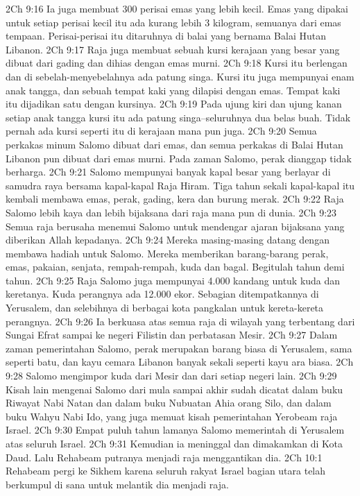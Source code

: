 2Ch 9:16  Ia juga membuat 300 perisai emas yang lebih kecil. Emas yang dipakai untuk setiap perisai kecil itu ada kurang lebih 3 kilogram, semuanya dari emas tempaan. Perisai-perisai itu ditaruhnya di balai yang bernama Balai Hutan Libanon.
2Ch 9:17  Raja juga membuat sebuah kursi kerajaan yang besar yang dibuat dari gading dan dihias dengan emas murni.
2Ch 9:18  Kursi itu berlengan dan di sebelah-menyebelahnya ada patung singa. Kursi itu juga mempunyai enam anak tangga, dan sebuah tempat kaki yang dilapisi dengan emas. Tempat kaki itu dijadikan satu dengan kursinya.
2Ch 9:19  Pada ujung kiri dan ujung kanan setiap anak tangga kursi itu ada patung singa--seluruhnya dua belas buah. Tidak pernah ada kursi seperti itu di kerajaan mana pun juga.
2Ch 9:20  Semua perkakas minum Salomo dibuat dari emas, dan semua perkakas di Balai Hutan Libanon pun dibuat dari emas murni. Pada zaman Salomo, perak dianggap tidak berharga.
2Ch 9:21  Salomo mempunyai banyak kapal besar yang berlayar di samudra raya bersama kapal-kapal Raja Hiram. Tiga tahun sekali kapal-kapal itu kembali membawa emas, perak, gading, kera dan burung merak.
2Ch 9:22  Raja Salomo lebih kaya dan lebih bijaksana dari raja mana pun di dunia.
2Ch 9:23  Semua raja berusaha menemui Salomo untuk mendengar ajaran bijaksana yang diberikan Allah kepadanya.
2Ch 9:24  Mereka masing-masing datang dengan membawa hadiah untuk Salomo. Mereka memberikan barang-barang perak, emas, pakaian, senjata, rempah-rempah, kuda dan bagal. Begitulah tahun demi tahun.
2Ch 9:25  Raja Salomo juga mempunyai 4.000 kandang untuk kuda dan keretanya. Kuda perangnya ada 12.000 ekor. Sebagian ditempatkannya di Yerusalem, dan selebihnya di berbagai kota pangkalan untuk kereta-kereta perangnya.
2Ch 9:26  Ia berkuasa atas semua raja di wilayah yang terbentang dari Sungai Efrat sampai ke negeri Filistin dan perbatasan Mesir.
2Ch 9:27  Dalam zaman pemerintahan Salomo, perak merupakan barang biasa di Yerusalem, sama seperti batu, dan kayu cemara Libanon banyak sekali seperti kayu ara biasa.
2Ch 9:28  Salomo mengimpor kuda dari Mesir dan dari setiap negeri lain.
2Ch 9:29  Kisah lain mengenai Salomo dari mula sampai akhir sudah dicatat dalam buku Riwayat Nabi Natan dan dalam buku Nubuatan Ahia orang Silo, dan dalam buku Wahyu Nabi Ido, yang juga memuat kisah pemerintahan Yerobeam raja Israel.
2Ch 9:30  Empat puluh tahun lamanya Salomo memerintah di Yerusalem atas seluruh Israel.
2Ch 9:31  Kemudian ia meninggal dan dimakamkan di Kota Daud. Lalu Rehabeam putranya menjadi raja menggantikan dia.
2Ch 10:1  Rehabeam pergi ke Sikhem karena seluruh rakyat Israel bagian utara telah berkumpul di sana untuk melantik dia menjadi raja.

